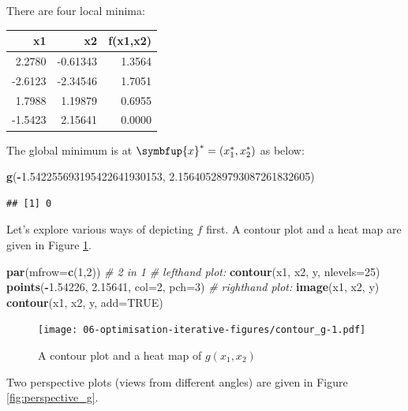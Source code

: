 \documentclass[10pt,b5paper,krantz1]{krantz}
\newenvironment{Shaded}{\begin{snugshade}}{\end{snugshade}}
\newcommand{\CommentTok}[1]{\textcolor[rgb]{0.37,0.37,0.37}{\textit{#1}}}
\newcommand{\DataTypeTok}[1]{\textcolor[rgb]{0.27,0.27,0.27}{#1}}
\newcommand{\DecValTok}[1]{\textcolor[rgb]{0.06,0.06,0.06}{#1}}
\newcommand{\FloatTok}[1]{\textcolor[rgb]{0.06,0.06,0.06}{#1}}
\newcommand{\KeywordTok}[1]{\textcolor[rgb]{0.27,0.27,0.27}{\textbf{#1}}}
\newcommand{\NormalTok}[1]{#1}
\newcommand{\OperatorTok}[1]{\textcolor[rgb]{0.43,0.43,0.43}{\textbf{#1}}}
\newcommand{\OtherTok}[1]{\textcolor[rgb]{0.37,0.37,0.37}{#1}}
\renewcommand{\mathbf}[1]{\symbfup{#1}}
\begin{document}
There are four local minima:

\begin{longtable}[]{@{}rrr@{}}
\toprule
x1 & x2 & f(x1,x2)\tabularnewline
\midrule
\endhead
2.2780 & -0.61343 & 1.3564\tabularnewline
-2.6123 & -2.34546 & 1.7051\tabularnewline
1.7988 & 1.19879 & 0.6955\tabularnewline
-1.5423 & 2.15641 & 0.0000\tabularnewline
\bottomrule
\end{longtable}

The global minimum is at \(\mathbf{x}^*=(x_1^*, x_2^*)\) as below:

\begin{Shaded}
\begin{Highlighting}[]
\KeywordTok{g}\NormalTok{(}\OperatorTok{-}\FloatTok{1.542255693195422641930153}\NormalTok{, }\FloatTok{2.156405289793087261832605}\NormalTok{)}
\end{Highlighting}
\end{Shaded}

\begin{verbatim}
## [1] 0
\end{verbatim}

Let's explore various ways of depicting \(f\) first.
A contour plot and a heat map
are given in Figure \ref{fig:contour_g}.

\begin{Shaded}
\begin{Highlighting}[]
\KeywordTok{par}\NormalTok{(}\DataTypeTok{mfrow=}\KeywordTok{c}\NormalTok{(}\DecValTok{1}\NormalTok{,}\DecValTok{2}\NormalTok{)) }\CommentTok{# 2 in 1}
\CommentTok{# lefthand plot:}
\KeywordTok{contour}\NormalTok{(x1, x2, y, }\DataTypeTok{nlevels=}\DecValTok{25}\NormalTok{)}
\KeywordTok{points}\NormalTok{(}\OperatorTok{-}\FloatTok{1.54226}\NormalTok{, }\FloatTok{2.15641}\NormalTok{, }\DataTypeTok{col=}\DecValTok{2}\NormalTok{, }\DataTypeTok{pch=}\DecValTok{3}\NormalTok{)}
\CommentTok{# righthand plot:}
\KeywordTok{image}\NormalTok{(x1, x2, y)}
\KeywordTok{contour}\NormalTok{(x1, x2, y, }\DataTypeTok{add=}\OtherTok{TRUE}\NormalTok{)}
\end{Highlighting}
\end{Shaded}

\begin{figure}
\hypertarget{fig:contour_g}{%
\centering
\texttt{[image: 06-optimisation-iterative-figures/contour\_g-1.pdf]}
\caption{A contour plot and a heat map of \(g(x_1,x_2)\)}\label{fig:contour_g}
}
\end{figure}

Two perspective plots (views from different angles) are given
in Figure \ref{fig:perspective_g}.
\end{document}
